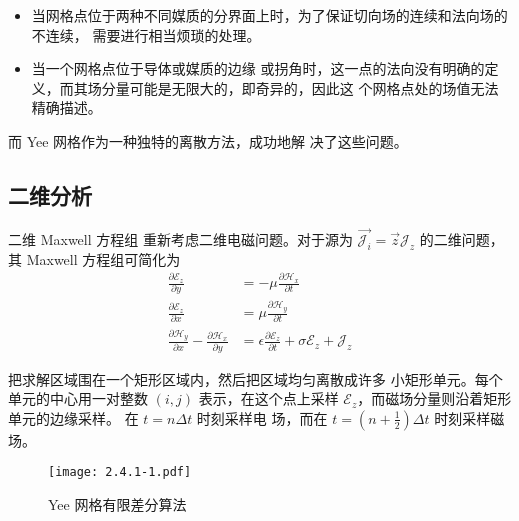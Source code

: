 \begin{itemize}
    \item 当网格点位于两种不同媒质的分界面上时，为了保证切向场的连续和法向场的不连续，
    需要进行相当烦琐的处理。
    \item 当一个网格点位于导体或媒质的边缘
    或拐角时，这一点的法向没有明确的定义，而其场分量可能是无限大的，即奇异的，因此这
    个网格点处的场值无法精确描述。
\end{itemize}

\par 而 Yee 网格作为一种独特的离散方法，成功地解
决了这些问题。

\subsection{二维分析}

\begin{definition}{二维 Maxwell 方程组}
    重新考虑二维电磁问题。对于源为 $\vec{\mathscr{J}_i}=\vec{z}\mathscr{J}_z$
    的二维问题，其 Maxwell 方程组可简化为
    \begin{align}
        \label{Yee Maxwell 方程组-1}
        \frac{\partial \mathscr{E}_z}{\partial y}
        &= -\mu \frac{\partial \mathscr{H}_x}{\partial t}\\
        \label{Yee Maxwell 方程组-2}
        \frac{\partial \mathscr{E}_z}{\partial x}
        &= \mu \frac{\partial \mathscr{H}_y}{\partial t}\\
        \label{Yee Maxwell 方程组-3}
        \frac{\partial \mathscr{H}_y}{\partial x}
        -\frac{\partial \mathscr{H}_x}{\partial y}
        &= \epsilon \frac{\partial \mathscr{E}_z}{\partial t}
        +\sigma \mathscr{E}_z + \mathscr{J}_z
    \end{align}
\end{definition}

\par 把求解区域围在一个矩形区域内，然后把区域均匀离散成许多
小矩形单元。每个单元的中心用一对整数 $(i,j)$ 表示，在这个点上采样
$\mathscr{E}_z$，而磁场分量则沿着矩形单元的边缘采样。
在 $t=n\Delta t$ 时刻采样电
场，而在 $t=\left(n+\frac{1}{2}\right)\Delta t$ 时刻采样磁场。

\begin{figure}[!htbp]
    \centering
    \texttt{[image: 2.4.1-1.pdf]}
    \caption{Yee 网格有限差分算法}
\end{figure}

